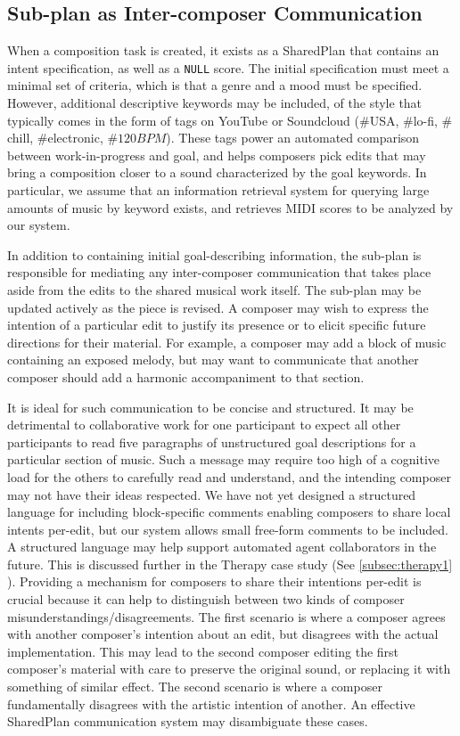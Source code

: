 \documentclass[final,authoryear,5p,times,twocolumn]{elsarticle}
\begin{document}
\subsection{Sub-plan as Inter-composer Communication}
\label{subsec:interComposer}
 
When a composition task is created, it exists as a SharedPlan that contains an intent specification, as well as a \texttt{NULL} score. The initial specification must meet a minimal set of criteria, which is that a genre and a mood must be specified. However, additional descriptive keywords may be included, of the style that typically comes in the form of tags on YouTube or Soundcloud ($\#$USA, $\#$lo-fi, $\#$chill, $\#$electronic, $\#120BPM$). These tags power an automated comparison between work-in-progress and goal, and helps composers pick edits that may bring a composition closer to a sound characterized by the goal keywords. In particular, we assume that an information retrieval system for querying large amounts of music by keyword exists, and retrieves MIDI scores to be analyzed by our system.

In addition to containing initial goal-describing information, the sub-plan is responsible for mediating any inter-composer communication that takes place aside from the edits to the shared musical work itself. The sub-plan may be updated actively as the piece is revised. A composer may wish to express the intention of a particular edit to justify its presence or to elicit specific future directions for their material. For example, a composer may add a block of music containing an exposed melody, but may want to communicate that another composer should add a harmonic accompaniment to that section.

It is ideal for such communication to be concise and structured. It may be detrimental to collaborative work for one participant to expect all other participants to read five paragraphs of unstructured goal descriptions for a particular section of music. Such a message may require too high of a cognitive load for the others to carefully read and understand, and the intending composer may not have their ideas respected. We have not yet designed a structured language for including block-specific comments enabling composers to share local intents per-edit, but our system allows small free-form comments to be included. A structured language may help support automated agent collaborators in the future. This is discussed further in the Therapy case study (See \ref{subsec:therapy1} ). Providing a mechanism for composers to share their intentions per-edit is crucial because it can help to distinguish between two kinds of composer misunderstandings/disagreements. The first scenario is where a composer agrees with another composer's intention about an edit, but disagrees with the actual implementation. This may lead to the second composer editing the first composer's material with care to preserve the original sound, or replacing it with something of similar effect. The second scenario is where a composer fundamentally disagrees with the artistic intention of another. An effective SharedPlan communication system may disambiguate these cases.
\end{document}
